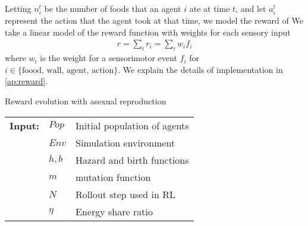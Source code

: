 Letting $n^{t}_{i}$ be the number of foods that an agent $i$ ate at time $t$, and let $a^{t}_{i}$ represent the action that the agent took at that time, we model the reward of
We take a linear model of the reward function with weights for each sensory input
\begin{align}
  r = \sum_i r_i = \sum_i w_i f_i
  \label{eq:reward}
\end{align}
where $w_i$ is the weight for a sensorimotor event $f_i$ for $i\in{\mbox{\{foood, wall, agent,  action\}}}$. We explain the details of implementation in \cref{ap:reward}.

\begin{algorithm}
  \caption{Reward evolution with asexual reproduction}\label{alg:reward-evo}
  \begin{tabular}{lll}
    \textbf{Input:} & $Pop$ & Initial population of agents \\
                    & $Env$ & Simulation environment \\
                    & $h, b$ & Hazard and birth functions \\
                    & $m$ & mutation function \\
                    & $N$ & Rollout step used in RL \\
                    & $\eta$ & Energy share ratio
  \end{tabular}
  \begin{algorithmic}[1]
    \Loop{}
      \EndOnce{}
    \EndFor{}
       
      \EndWith{}
       
      \EndWith{}
    \EndFor{}
  \EndLoop{}
\end{algorithmic}
\end{algorithm}


